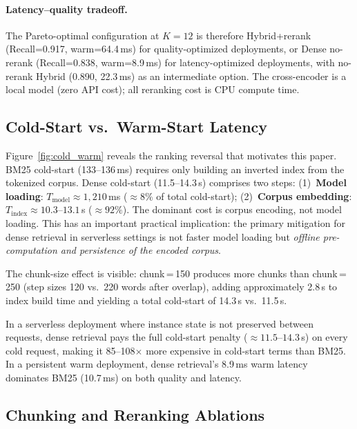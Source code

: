 \documentclass[11pt,a4paper]{article}
\begin{document}
\paragraph{Latency--quality tradeoff.}
The Pareto-optimal configuration at $K=12$ is therefore Hybrid+rerank
(Recall=0.917, warm=64.4\,ms) for quality-optimized deployments, or
Dense no-rerank (Recall=0.838, warm=8.9\,ms) for latency-optimized
deployments, with no-rerank Hybrid (0.890, 22.3\,ms) as an intermediate option.
The cross-encoder is a local model (zero API cost); all reranking cost is
CPU compute time.

\subsection{Cold-Start vs.\ Warm-Start Latency}
\label{sec:results_cold}

Figure~\ref{fig:cold_warm} reveals the ranking reversal that motivates this
paper.
BM25 cold-start (133--136\,ms) requires only building an inverted index from
the tokenized corpus.
Dense cold-start (11.5--14.3\,s) comprises two steps:
(1)~\textbf{Model loading}: $T_{\mathrm{model}} \approx 1{,}210$\,ms
($\approx\!8\%$ of total cold-start);
(2)~\textbf{Corpus embedding}: $T_{\mathrm{index}} \approx 10.3$--$13.1$\,s
($\approx\!92\%$).
The dominant cost is corpus encoding, not model loading.
This has an important practical implication: the primary mitigation for
dense retrieval in serverless settings is not faster model loading but
\emph{offline pre-computation and persistence of the encoded corpus}.

The chunk-size effect is visible: chunk\,=\,150 produces more chunks than
chunk\,=\,250 (step sizes 120 vs.\ 220 words after overlap), adding
approximately 2.8\,s to index build time and yielding a total cold-start
of 14.3\,s vs.\ 11.5\,s.

In a serverless deployment where instance state is not preserved between
requests, dense retrieval pays the full cold-start penalty ($\approx\!11.5$--$14.3$\,s)
on every cold request, making it 85--108$\times$ more expensive in cold-start
terms than BM25.
In a persistent warm deployment, dense retrieval's 8.9\,ms warm latency
dominates BM25 (10.7\,ms) on both quality and latency.

\subsection{Chunking and Reranking Ablations}
\label{sec:ablations}
\end{document}
